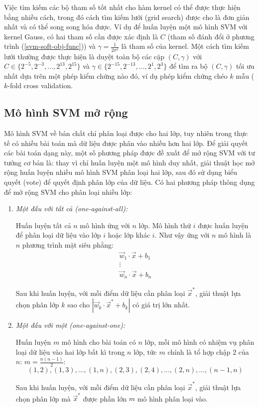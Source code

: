 Việc tìm kiếm các bộ tham số tốt nhất cho hàm kernel có thể được thực hiện bằng nhiều cách, trong đó cách tìm kiếm lưới (grid search) được cho là đơn giản nhất và có thể song song hóa được. Ví dụ để huấn luyện một mô hình SVM với kernel Gauss, có hai tham số cần được xác định là $C$ (tham số đánh đổi ở phương trình (\ref{svm-soft-obj-func})) và $\gamma=\frac{1}{2\sigma^2}$ là tham số của kernel. Một cách tìm kiếm lưới thường được thực hiện là duyệt toàn bộ các cặp $(C,\gamma)$ với $C\in\{2^{-5},2^{-3},\dots,2^{13},2^{15}\}$ và $\gamma\in\{2^{-15},2^{-13},\dots,2^1,2^3\}$ để tìm ra bộ $(C,\gamma)$ tối ưu nhất dựa trên một phép kiểm chứng nào đó, ví dụ phép kiểm chứng chéo $k$ mẫu ($k$-fold cross validation.%

\subsection*{Mô hình SVM mở rộng}
Mô hình SVM về bản chất chỉ phân loại được cho hai lớp, tuy nhiên trong thực tế có nhiều bài toán mà dữ liệu được phân vào nhiều hơn hai lớp. Để giải quyết các bài toán dạng này, một số phương pháp được đề xuất để mở rộng SVM với tư tưởng cơ bản là: thay vì chỉ huấn luyện một mô hình duy nhất, giải thuật học mở rộng huấn luyện nhiều mô hình SVM phân loại hai lớp, sau đó sử dụng biểu quyết (vote) để quyết định phân lớp của dữ liệu. Có hai phương pháp thông dụng để mở rộng SVM cho phân loại nhiều lớp:
\begin{enumerate}
\item \emph{Một đấu với tất cả (one-against-all):}

Huấn luyện tất cả $n$ mô hình ứng với $n$ lớp. Mô hình thứ $i$ được huấn luyện để phân loại dữ liệu vào lớp $i$ hoặc lớp khác $i$. Như vậy ứng với $n$ mô hình là $n$ phương trình mặt siêu phẳng:
\[
\begin{matrix}
\vec{w}_1\cdot\vec{x}+b_1\\
\vdots\\
\vec{w}_n\cdot\vec{x}+b_n
\end{matrix}
\]

Sau khi huấn luyện, với mỗi điểm dữ liệu cần phân loại $\vec{x}^*$, giải thuật lựa chọn phân lớp $k$ sao cho $|\vec{w}_k\cdot\vec{x}^*+b_k|$ có giá trị lớn nhất.
\item \emph{Một đấu với một (one-against-one):}

Huấn luyện $m$ mô hình cho bài toán có $n$ lớp, mỗi mô hình có nhiệm vụ phân loại dữ liệu vào hai lớp bất kì trong $n$ lớp, tức $m$ chính là tổ hợp chập 2 của $n$: $m=\frac{n(n-1)}{2}$:\[(1,2),(1,3),\dots,(1,n),(2,3),(2,4),\dots,(2,n),\dots,(n-1,n)\]

Sau khi huấn luyện, với mỗi điểm dữ liệu cần phân loại $\vec{x}^*$, giải thuật lựa chọn phân lớp mà $\vec{x}^*$ được phần lớn $m$ mô hình phân loại vào.
\end{enumerate}

